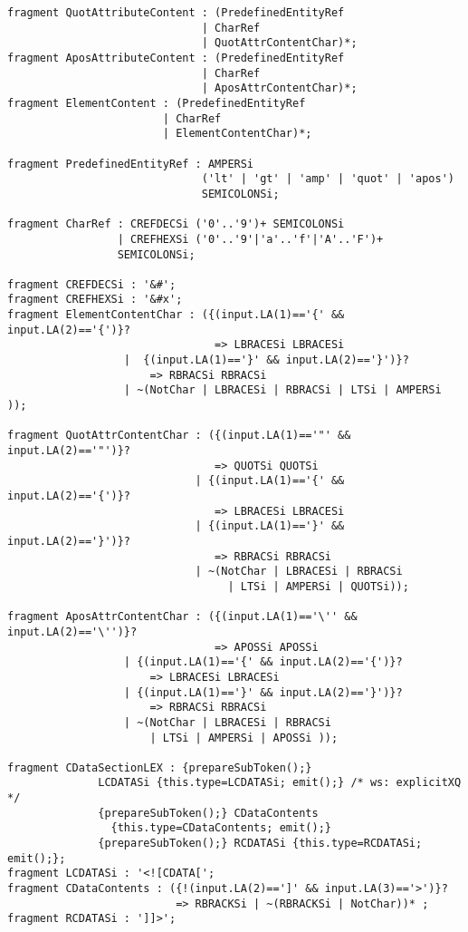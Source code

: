 \begin{Verbatim}[frame=none, fontsize=\footnotesize]
fragment QuotAttributeContent : (PredefinedEntityRef 
                              | CharRef 
                              | QuotAttrContentChar)*;
fragment AposAttributeContent : (PredefinedEntityRef 
                              | CharRef 
                              | AposAttrContentChar)*;
fragment ElementContent : (PredefinedEntityRef 
                        | CharRef 
                        | ElementContentChar)*;

fragment PredefinedEntityRef : AMPERSi 
                              ('lt' | 'gt' | 'amp' | 'quot' | 'apos') 
                              SEMICOLONSi;
  
fragment CharRef : CREFDECSi ('0'..'9')+ SEMICOLONSi 
                 | CREFHEXSi ('0'..'9'|'a'..'f'|'A'..'F')+ 
                 SEMICOLONSi;

fragment CREFDECSi : '&#';
fragment CREFHEXSi : '&#x';
fragment ElementContentChar : ({(input.LA(1)=='{' && input.LA(2)=='{')}?
                                => LBRACESi LBRACESi 
                  |  {(input.LA(1)=='}' && input.LA(2)=='}')}?
                      => RBRACSi RBRACSi 
                  | ~(NotChar | LBRACESi | RBRACSi | LTSi | AMPERSi ));

fragment QuotAttrContentChar : ({(input.LA(1)=='"' && input.LA(2)=='"')}?
                                => QUOTSi QUOTSi
                             | {(input.LA(1)=='{' && input.LA(2)=='{')}?
                                => LBRACESi LBRACESi 
                             | {(input.LA(1)=='}' && input.LA(2)=='}')}?
                                => RBRACSi RBRACSi 
                             | ~(NotChar | LBRACESi | RBRACSi 
                                  | LTSi | AMPERSi | QUOTSi));

fragment AposAttrContentChar : ({(input.LA(1)=='\'' && input.LA(2)=='\'')}?
                                => APOSSi APOSSi
                  | {(input.LA(1)=='{' && input.LA(2)=='{')}?
                      => LBRACESi LBRACESi 
                  | {(input.LA(1)=='}' && input.LA(2)=='}')}?
                      => RBRACSi RBRACSi 
                  | ~(NotChar | LBRACESi | RBRACSi 
                      | LTSi | AMPERSi | APOSSi ));

fragment CDataSectionLEX : {prepareSubToken();}   
              LCDATASi {this.type=LCDATASi; emit();} /* ws: explicitXQ */
              {prepareSubToken();} CDataContents
                {this.type=CDataContents; emit();}
              {prepareSubToken();} RCDATASi {this.type=RCDATASi; emit();};
fragment LCDATASi : '<![CDATA[';
fragment CDataContents : ({!(input.LA(2)==']' && input.LA(3)=='>')}?
                          => RBRACKSi | ~(RBRACKSi | NotChar))* ;
fragment RCDATASi : ']]>';


\end{Verbatim}
